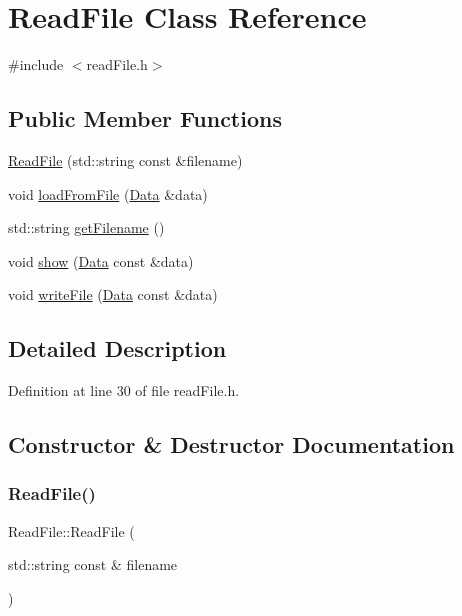 \hypertarget{class_read_file}{}\section{Read\+File Class Reference}
\label{class_read_file}


{\ttfamily \#include $<$read\+File.\+h$>$}

\subsection*{Public Member Functions}
\begin{DoxyCompactItemize}
\item 
\mbox{\hyperlink{class_read_file_ae297f0539380fc9b703a1bceda2ce820}{Read\+File}} (std\+::string const \&filename)
\item 
void \mbox{\hyperlink{class_read_file_a232df426223b84e4dbb3f964ee4c3177}{load\+From\+File}} (\mbox{\hyperlink{struct_data}{Data}} \&data)
\item 
std\+::string \mbox{\hyperlink{class_read_file_a9835264c9ec95cfdbc1349573402fc01}{get\+Filename}} ()
\item 
void \mbox{\hyperlink{class_read_file_a5efc41b900510ae038dafc23a2563300}{show}} (\mbox{\hyperlink{struct_data}{Data}} const \&data)
\item 
void \mbox{\hyperlink{class_read_file_ac11779a3630a2c1d62ab4566abb4034a}{write\+File}} (\mbox{\hyperlink{struct_data}{Data}} const \&data)
\end{DoxyCompactItemize}


\subsection{Detailed Description}


Definition at line 30 of file read\+File.\+h.



\subsection{Constructor \& Destructor Documentation}
\mbox{\label{class_read_file_ae297f0539380fc9b703a1bceda2ce820}} 
\subsubsection{\texorpdfstring{Read\+File()}{ReadFile()}}
{\footnotesize\ttfamily Read\+File\+::\+Read\+File (\begin{DoxyParamCaption}\item[{std\+::string const \&}]{filename }\end{DoxyParamCaption})}







